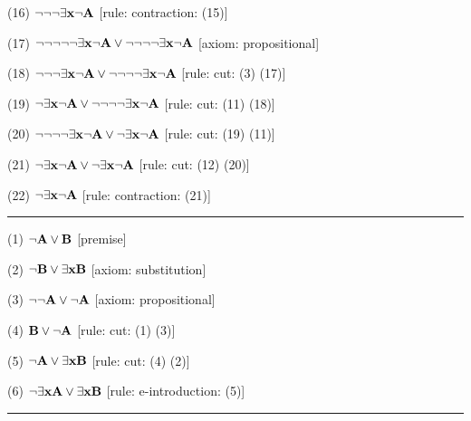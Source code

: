 \item{(16)} $\neg \neg \neg \exists {\bf x} \neg {\bf A}$ \hfill [rule: contraction: (15)]
\item{(17)} $\neg \neg \neg \neg \neg \exists {\bf x} \neg {\bf A} \lor \neg \neg \neg \neg \exists {\bf x} \neg {\bf A}$ \hfill [axiom: propositional]
\item{(18)} $\neg \neg \neg \exists {\bf x} \neg {\bf A} \lor \neg \neg \neg \neg \exists {\bf x} \neg {\bf A}$ \hfill [rule: cut: (3) (17)]
\item{(19)} $\neg \exists {\bf x} \neg {\bf A} \lor \neg \neg \neg \neg \exists {\bf x} \neg {\bf A}$ \hfill [rule: cut: (11) (18)]
\item{(20)} $\neg \neg \neg \neg \exists {\bf x} \neg {\bf A} \lor \neg \exists {\bf x} \neg {\bf A}$ \hfill [rule: cut: (19) (11)]
\item{(21)} $\neg \exists {\bf x} \neg {\bf A} \lor \neg \exists {\bf x} \neg {\bf A}$ \hfill [rule: cut: (12) (20)]
\item{(22)} $\neg \exists {\bf x} \neg {\bf A}$ \hfill [rule: contraction: (21)]
\medskip
\hrule
\medskip
\item{(1)} $\neg {\bf A} \lor {\bf B}$ \hfill [premise]
\item{(2)} $\neg {\bf B} \lor \exists {\bf x} {\bf B}$ \hfill [axiom: substitution]
\item{(3)} $\neg \neg {\bf A} \lor \neg {\bf A}$ \hfill [axiom: propositional]
\item{(4)} ${\bf B} \lor \neg {\bf A}$ \hfill [rule: cut: (1) (3)]
\item{(5)} $\neg {\bf A} \lor \exists {\bf x} {\bf B}$ \hfill [rule: cut: (4) (2)]
\item{(6)} $\neg \exists {\bf x} {\bf A} \lor \exists {\bf x} {\bf B}$ \hfill [rule: e-introduction: (5)]
\medskip
\hrule
\medskip

\vfill
\break

